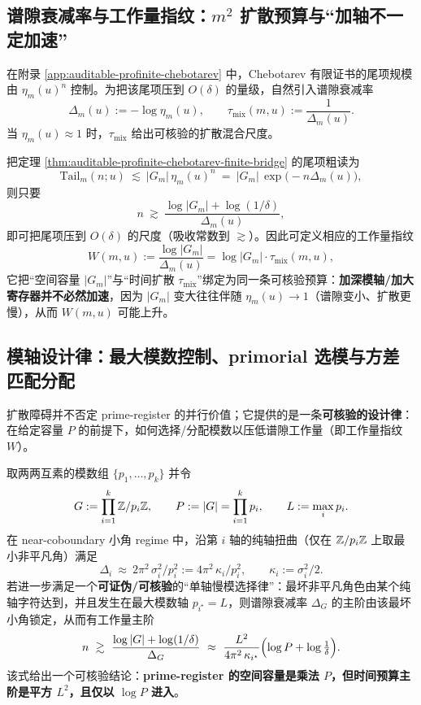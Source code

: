 \subsection{谱隙衰减率与工作量指纹：\texorpdfstring{$m^2$}{m2} 扩散预算与“加轴不一定加速”}\label{subsec:spectral-tax}

在附录 \ref{app:auditable-profinite-chebotarev} 中，Chebotarev 有限证书的尾项规模由 \(\eta_m(u)^n\) 控制。为把该尾项压到 \(O(\delta)\) 的量级，自然引入谱隙衰减率
$$
\Delta_m(u):=-\log \eta_m(u),\qquad \tau_{\mathrm{mix}}(m,u):=\frac{1}{\Delta_m(u)}.
$$
当 \(\eta_m(u)\approx 1\) 时，\(\tau_{\mathrm{mix}}\) 给出可核验的扩散混合尺度。

\begin{remark}[谱隙衰减率的工作量指纹]\label{rem:spectral-tax-workload}
把定理 \ref{thm:auditable-profinite-chebotarev-finite-bridge} 的尾项粗读为
$$
\mathrm{Tail}_m(n;u)\ \lesssim\ |G_m|\,\eta_m(u)^n
\ =\ |G_m|\,\exp\!\bigl(-n\Delta_m(u)\bigr),
$$
则只要
$$
n\ \gtrsim\ \frac{\log|G_m|+\log(1/\delta)}{\Delta_m(u)},
$$
即可把尾项压到 \(O(\delta)\) 的尺度（吸收常数到 \(\gtrsim\)）。因此可定义相应的工作量指纹
$$
W(m,u):=\frac{\log|G_m|}{\Delta_m(u)}=\log|G_m|\cdot\tau_{\mathrm{mix}}(m,u),
$$
它把“空间容量 \(|G_m|\)”与“时间扩散 \(\tau_{\mathrm{mix}}\)”绑定为同一条可核验预算：\textbf{加深模轴/加大寄存器并不必然加速}，因为 \(|G_m|\) 变大往往伴随 \(\eta_m(u)\to 1\)（谱隙变小、扩散更慢），从而 \(W(m,u)\) 可能上升。
\end{remark}

\subsection{模轴设计律：最大模数控制、primorial 选模与方差匹配分配}\label{subsec:moduli-design-laws}

扩散障碍并不否定 prime-register 的并行价值；它提供的是一条\textbf{可核验的设计律}：在给定容量 \(P\) 的前提下，如何选择/分配模数以压低谱隙工作量（即工作量指纹 $W$）。

\begin{remark}\label{rem:tax-max-modulus-control-law}
取两两互素的模数组 \(\{p_1,\dots,p_k\}\) 并令
$$
G:=\prod_{i=1}^k\mathbb{Z}/p_i\mathbb{Z},\qquad
P:=|G|=\prod_{i=1}^k p_i,\qquad
L:=\max_i p_i.
$$
在 near-coboundary 小角 regime 中，沿第 \(i\) 轴的纯轴扭曲（仅在 \(\mathbb{Z}/p_i\mathbb{Z}\) 上取最小非平凡角）满足
$$
\Delta_i\ \approx\ 2\pi^2\,\sigma_i^2/p_i^2
:=4\pi^2\,\kappa_i/p_i^2,\qquad \kappa_i:=\sigma_i^2/2.
$$
若进一步满足一个\textbf{可证伪/可核验}的“单轴慢模选择律”：最坏非平凡角色由某个纯轴字符达到，并且发生在最大模数轴 \(p_{i^\star}=L\)，则谱隙衰减率 \(\Delta_G\) 的主阶由该最坏小角锁定，从而有工作量主阶
$$
n\ \gtrsim\ \frac{\log|G|+\log(1/\delta)}{\Delta_G}
\ \approx\
\frac{L^2}{4\pi^2\,\kappa_{i^\star}}\Bigl(\log P+\log\tfrac{1}{\delta}\Bigr).
$$
该式给出一个可核验结论：\textbf{prime-register 的空间容量是乘法 \(P\)，但时间预算主阶是平方 \(L^2\)，且仅以 \(\log P\) 进入}。
\end{remark}

